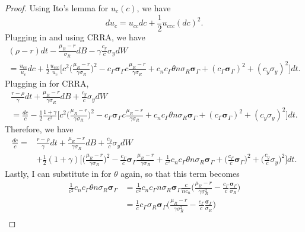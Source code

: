 \documentclass[11pt]{extarticle}
\theoremstyle{plain}
\theoremstyle{definition}
\begin{document}
\begin{proof}
	
	Using Ito's lemma for $u_c(c)$, we have 
	\begin{equation*}
		du_c = u_{cc} dc + \frac{1}{2} u_{ccc} (dc)^2. 
	\end{equation*}
	Plugging in and using CRRA, we have 
	\begin{gather*}
		(\rho - r) dt -  \frac{\mu_R - r}{\sigma_R} dB  - \gamma \frac{c_y}{c} \sigma_y dW \\
		= \frac{u_{cc}}{u_c} dc + \frac{1}{2} \frac{u_{ccc}}{u_c} \bigg[ c^2 \bigg( \frac{\mu_R - r}{\gamma \sigma_R} \bigg)^2  - c_\Gamma  \bm \sigma_\Gamma  c \frac{\mu_R - r}{\gamma \sigma_R} + c_n c_\Gamma \theta n \sigma_R \bm \sigma_\Gamma + (c_\Gamma \bm \sigma_\Gamma)^2 + (c_y \sigma_y)^2 \bigg] dt.
	\end{gather*}
	Plugging in for CRRA, 
	\begin{gather*}
		\frac{r - \rho}{\gamma} dt +  \frac{\mu_R - r}{\gamma \sigma_R} dB  + \frac{c_y}{c} \sigma_y dW \\
		= \frac{dc}{c} - \frac{1}{2} \frac{1+\gamma}{c^2} \bigg[ c^2 \bigg( \frac{\mu_R - r}{\gamma \sigma_R} \bigg)^2  - c_\Gamma  \bm \sigma_\Gamma  c \frac{\mu_R - r}{\gamma \sigma_R} + c_n c_\Gamma \theta n \sigma_R \bm \sigma_\Gamma + (c_\Gamma \bm \sigma_\Gamma)^2 + (c_y \sigma_y)^2 \bigg] dt.
	\end{gather*}	
	Therefore, we have 
	\begin{align*}
		\frac{dc}{c} = & \frac{r - \rho}{\gamma} dt +  \frac{\mu_R - r}{\gamma \sigma_R} dB  + \frac{c_y}{c} \sigma_y dW \\
		&+ \frac{1}{2} (1+\gamma) \bigg[ \bigg( \frac{\mu_R - r}{\gamma \sigma_R} \bigg)^2  - \frac{c_\Gamma }{c} \bm \sigma_\Gamma \frac{\mu_R - r}{\gamma \sigma_R} + \frac{1}{c^2} c_n c_\Gamma \theta n \sigma_R \bm \sigma_\Gamma + \bigg( \frac{c_\Gamma}{c} \bm \sigma_\Gamma \bigg)^2 + \bigg( \frac{c_y}{c} \sigma_y \bigg)^2 \bigg] dt.
	\end{align*}
	Lastly, I can substitute in for $\theta$ again, so that this term becomes 
	\begin{align*}
		\frac{1}{c^2} c_n c_\Gamma \theta n \sigma_R \bm \sigma_\Gamma &= \frac{1}{c^2} c_n c_\Gamma n \sigma_R \bm \sigma_\Gamma \frac{c}{n c_n} \bigg( \frac{\mu_R - r}{\gamma \sigma_R^2 } - \frac{c_\Gamma}{c} \frac{ \bm \sigma_\Gamma }{\sigma_R} \bigg) \\
		&= \frac{1}{c} c_\Gamma \sigma_R \bm \sigma_\Gamma \bigg( \frac{\mu_R - r}{\gamma \sigma_R^2 } - \frac{c_\Gamma}{c} \frac{ \bm \sigma_\Gamma }{\sigma_R} \bigg) \\

\end{align*}
\end{proof}
\end{document}
